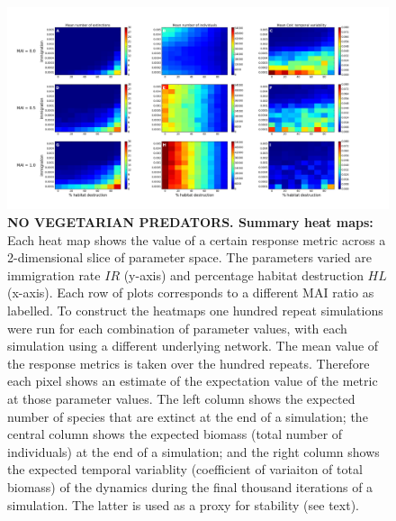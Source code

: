 \thispagestyle{empty}
\begin{figure}

		\centering      
		\hspace{-3cm}

        \includegraphics[width=\linewidth]{"./chapters/chapter04/figures/sum_maps_noveg"}
        \caption{\textbf{NO VEGETARIAN PREDATORS. Summary heat maps:} Each heat map shows the value of a certain response metric across a 2-dimensional slice of parameter space. The parameters varied are immigration rate $IR$ (y-axis) and percentage habitat destruction $HL$ (x-axis). Each row of plots corresponds to a different MAI ratio as labelled. To construct the heatmaps one hundred repeat simulations were run for each combination of parameter values, with each simulation using a different underlying network. The mean value of the response metrics is taken over the hundred repeats. Therefore each pixel shows an estimate of the expectation value of the metric at those parameter values. The left column shows the expected number of species that are extinct at the end of a simulation; the central column shows the expected biomass (total number of individuals) at the end of a simulation; and the right column shows the expected temporal variablity (coefficient of variaiton of total biomass) of the dynamics during the final thousand iterations of a simulation. The latter is used as a proxy for stability (see text).}\label{fig:summary_heatmaps_imvshl_noveg}
\end{figure}
\clearpage